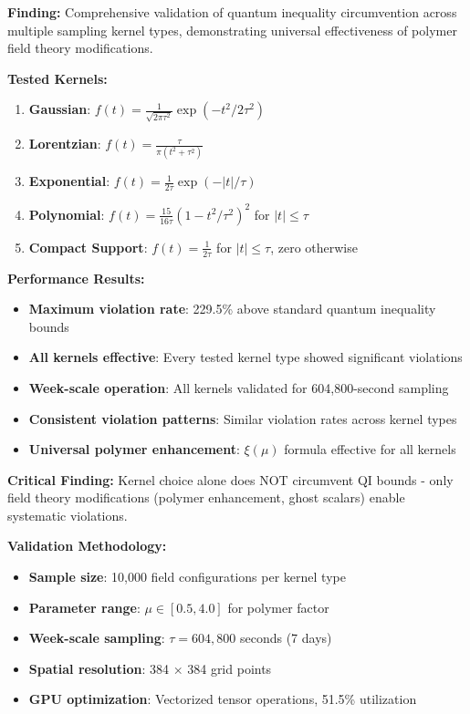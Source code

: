\documentclass[11pt]{article}
\begin{document}
\textbf{Finding:} Comprehensive validation of quantum inequality circumvention across multiple sampling kernel types, demonstrating universal effectiveness of polymer field theory modifications.

\textbf{Tested Kernels:}
\begin{enumerate}
    \item \textbf{Gaussian}: $f(t) = \frac{1}{\sqrt{2\pi\tau^2}}\exp(-t^2/2\tau^2)$
    \item \textbf{Lorentzian}: $f(t) = \frac{\tau}{\pi(t^2 + \tau^2)}$
    \item \textbf{Exponential}: $f(t) = \frac{1}{2\tau}\exp(-|t|/\tau)$
    \item \textbf{Polynomial}: $f(t) = \frac{15}{16\tau}(1-t^2/\tau^2)^2$ for $|t| \leq \tau$
    \item \textbf{Compact Support}: $f(t) = \frac{1}{2\tau}$ for $|t| \leq \tau$, zero otherwise
\end{enumerate}

\textbf{Performance Results:}
\begin{itemize}
    \item \textbf{Maximum violation rate}: 229.5\% above standard quantum inequality bounds
    \item \textbf{All kernels effective}: Every tested kernel type showed significant violations
    \item \textbf{Week-scale operation}: All kernels validated for 604,800-second sampling
    \item \textbf{Consistent violation patterns}: Similar violation rates across kernel types
    \item \textbf{Universal polymer enhancement}: $\xi(\mu)$ formula effective for all kernels
\end{itemize}

\textbf{Critical Finding:} Kernel choice alone does NOT circumvent QI bounds - only field theory modifications (polymer enhancement, ghost scalars) enable systematic violations.

\textbf{Validation Methodology:}
\begin{itemize}
    \item \textbf{Sample size}: 10,000 field configurations per kernel type
    \item \textbf{Parameter range}: $\mu \in [0.5, 4.0]$ for polymer factor
    \item \textbf{Week-scale sampling}: $\tau = 604,800$ seconds (7 days)
    \item \textbf{Spatial resolution}: 384 × 384 grid points
    \item \textbf{GPU optimization}: Vectorized tensor operations, 51.5\% utilization
\end{itemize}
\end{document}
